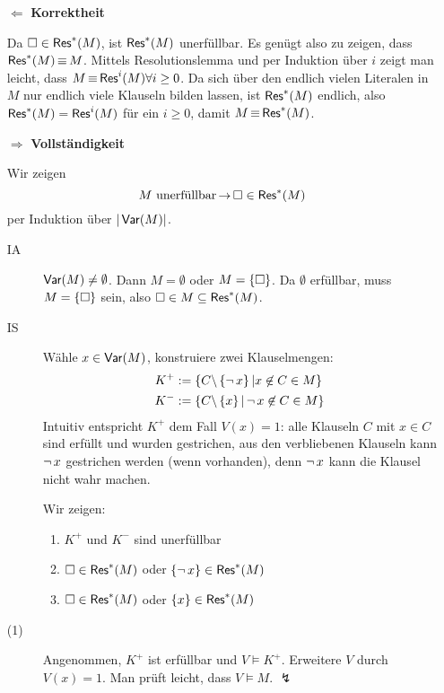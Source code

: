 \begin{itemize}
  \item[$\Leftarrow$] \textbf{Korrektheit}\par
  Da $\square \in \operatorname{\text{\textsf{Res}}}^*(M)$, ist $\operatorname{\text{\textsf{Res}}}^*(M)$ unerfüllbar. Es genügt also zu zeigen, dass $\operatorname{\text{\textsf{Res}}}^*(M)\operatorname{\equiv} M$.
  Mittels Resolutionslemma und per Induktion über $i$ zeigt man leicht, dass $M\operatorname{\equiv} \operatorname{\text{\textsf{Res}}}^i(M) \forall i \geq 0$.
  Da sich über den endlich vielen Literalen in $M$ nur endlich viele Klauseln bilden lassen, ist $\operatorname{\text{\textsf{Res}}}^*(M)$ endlich, also $\operatorname{\text{\textsf{Res}}}^*(M) = \operatorname{\text{\textsf{Res}}}^i(M)$ für ein $i\geq 0$, damit $M\operatorname{\equiv} \operatorname{\text{\textsf{Res}}}^*(M)$.
  
  \item[$\Rightarrow$] \textbf{Vollständigkeit}\par
  Wir zeigen
  \[
    M\ \text{unerfüllbar} \operatorname{\rightarrow} \square \in \operatorname{\text{\textsf{Res}}}^*(M)
  \]
  per Induktion über $|\operatorname{\text{\textsf{Var}}}(M)|$.
  \begin{description}
    \item[IA] $\operatorname{\text{\textsf{Var}}}(M) \not= \emptyset$. Dann $M=\emptyset$ oder $M=\left\{\square\right\}$.
    Da $\emptyset$ erfüllbar, muss $M=\left\{\square\right\}$ sein, also $\square\in M \subseteq \operatorname{\text{\textsf{Res}}}^*(M)$.
    
    \item[IS] Wähle $x\in \operatorname{\text{\textsf{Var}}}(M)$, konstruiere zwei Klauselmengen:
    \begin{align}
      K^+ &:= \left\{C \backslash \left\{\operatorname{\neg} x\right\} | x \not\in C \in M\right\} \\
      K^- &:= \left\{C \backslash \left\{x\right\} | \operatorname{\neg} x \not\in C \in M\right\} 
    \end{align}
    Intuitiv entspricht $K^+$ dem Fall $V(x) = 1$: alle Klauseln $C$ mit $x \in C$
    sind erfüllt und wurden gestrichen, aus den verbliebenen Klauseln kann
    $\operatorname{\neg} x$ gestrichen werden (wenn vorhanden), denn $\operatorname{\neg} x$ kann die Klausel
    nicht wahr machen.
    
    Wir zeigen:
    \begin{enumerate}
      \item $K^+$ und $K^-$ sind unerfüllbar
      \item $\square \in \operatorname{\text{\textsf{Res}}}^*(M)$ oder $\left\{\operatorname{\neg} x\right\} \in \operatorname{\text{\textsf{Res}}}^*(M)$
      \item $\square \in \operatorname{\text{\textsf{Res}}}^*(M)$ oder $\left\{x\right\} \in \operatorname{\text{\textsf{Res}}}^*(M)$
    \end{enumerate}
    
    \item[(1)] Angenommen, $K^+$ ist erfüllbar und $V\models K^+$.
    Erweitere $V$ durch $V(x)=1$. Man prüft leicht, dass $V\models M$. $\lightning$
    

\end{description}
\end{itemize}
